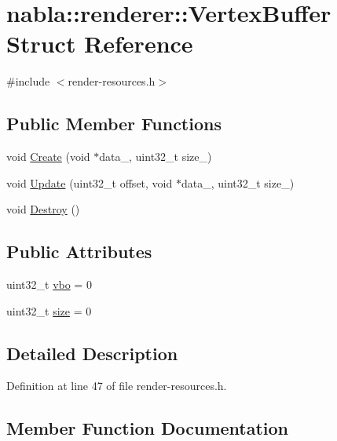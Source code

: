 \hypertarget{structnabla_1_1renderer_1_1_vertex_buffer}{}\section{nabla\+::renderer\+::Vertex\+Buffer Struct Reference}
\label{structnabla_1_1renderer_1_1_vertex_buffer}


{\ttfamily \#include $<$render-\/resources.\+h$>$}

\subsection*{Public Member Functions}
\begin{DoxyCompactItemize}
\item 
void \mbox{\hyperlink{structnabla_1_1renderer_1_1_vertex_buffer_af16bcea07f47418021e36320bc4b35fc}{Create}} (void $\ast$data\+\_\+, uint32\+\_\+t size\+\_\+)
\item 
void \mbox{\hyperlink{structnabla_1_1renderer_1_1_vertex_buffer_ae62c233fb62d9e9787388dff60d65650}{Update}} (uint32\+\_\+t offset, void $\ast$data\+\_\+, uint32\+\_\+t size\+\_\+)
\item 
void \mbox{\hyperlink{structnabla_1_1renderer_1_1_vertex_buffer_a688c92818f5e914ed282b0d15cca4ca1}{Destroy}} ()
\end{DoxyCompactItemize}
\subsection*{Public Attributes}
\begin{DoxyCompactItemize}
\item 
uint32\+\_\+t \mbox{\hyperlink{structnabla_1_1renderer_1_1_vertex_buffer_ac5880e8fd501c1166000351454c54235}{vbo}} = 0
\item 
uint32\+\_\+t \mbox{\hyperlink{structnabla_1_1renderer_1_1_vertex_buffer_a994712714282a9bf4a7d2c9d2b4472d5}{size}} = 0
\end{DoxyCompactItemize}


\subsection{Detailed Description}


Definition at line 47 of file render-\/resources.\+h.



\subsection{Member Function Documentation}
\mbox{\label{structnabla_1_1renderer_1_1_vertex_buffer_af16bcea07f47418021e36320bc4b35fc}} 
